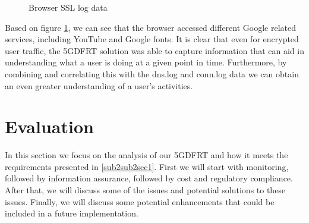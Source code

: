 \documentclass[final,1p,times,authoryear]{elsarticle}
\begin{document}
\begin{figure}[H]
  \centering
  \caption{Browser SSL log data}
  \label{fig:ssl-browser-traffic}
\end{figure}

Based on figure \ref{fig:ssl-browser-traffic}, we can see that the browser accessed different Google related services, including YouTube and Google fonts. It is clear that even for encrypted user traffic, the 5GDFRT solution was able to capture information that can aid in understanding what a user is doing at a given point in time. Furthermore, by combining and correlating this with the dns.log and conn.log data we can obtain an even greater understanding of a user's activities.

\newpage
\section{Evaluation}
\label{sec5}
In this section we focus on the analysis of our 5GDFRT and how it meets the requirements presented in \ref{sub2sub2sec1}. First we will start with monitoring, followed by information assurance, followed by cost and regulatory compliance. After that, we will discuss some of the issues and potential solutions to these issues. Finally, we will discuss some potential enhancements that could be included in a future implementation.
\end{document}
